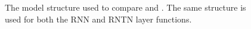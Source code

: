 \begin{figure}[tp]
  \centering
  
  \caption{The model structure used to compare  and . 
    The same structure is used for both the RNN and RNTN layer functions.} 
  \label{sample-figure}
\end{figure}



